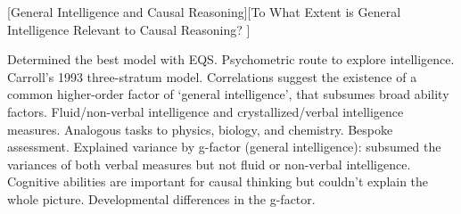 [General Intelligence and Causal Reasoning][To What Extent is
  General Intelligence Relevant to Causal Reasoning?
]

\begin{affils}
\end{affils}

Determined the best model with EQS.
Psychometric route to explore intelligence.
Carroll's 1993 three-stratum model.
Correlations suggest the existence of a common higher-order factor of `general
intelligence', that subsumes broad ability factors.
Fluid/non-verbal intelligence and crystallized/verbal intelligence measures.
Analogous tasks to physics, biology, and chemistry.
Bespoke assessment.
Explained variance by g-factor (general intelligence): subsumed the variances of both
verbal measures but not fluid or non-verbal intelligence.
Cognitive abilities are important for causal thinking but couldn't explain the whole
picture.
Developmental differences in the g-factor.
